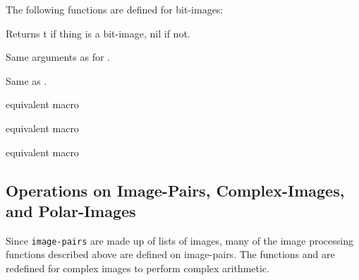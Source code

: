 The following functions are defined for bit-images:
\begin{description}
\item{}
Returns t if thing is a bit-image, nil if not.

\item{}
\item{}
\item{}

\item{}
Same arguments as for .

\item{}

\item{}
Same as .

\item{}
\item{}
\item{}
\item{}

\item{}
equivalent macro 

\item{}
equivalent macro 

\item{}
equivalent macro 

\end{description}


\subsection{Operations on Image-Pairs, Complex-Images, and Polar-Images}

Since {\tt image-pairs} are made up of lists of images, many of the
image processing functions described above are defined on image-pairs.
The functions  and  are redefined for complex images
to perform complex arithmetic.  

